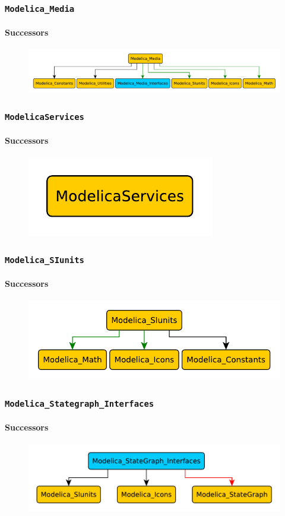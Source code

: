 \documentclass[aspectratio=1610]{beamer}
\begin{document}
\begin{frame}
  \frametitle{\texttt{Modelica\_Media}}
  \framesubtitle{Successors}
  \begin{figure}
      \includegraphics[width=\textwidth]{Modelica_Media}
  \end{figure}
\end{frame}

\begin{frame}
  \frametitle{\texttt{ModelicaServices}}
  \framesubtitle{Successors}
  \begin{figure}
      \includegraphics[width=\textwidth]{ModelicaServices}
  \end{figure}
\end{frame}

\begin{frame}
  \frametitle{\texttt{Modelica\_SIunits}}
  \framesubtitle{Successors}
  \begin{figure}
      \includegraphics[width=\textwidth]{Modelica_SIunits}
  \end{figure}
\end{frame}

\begin{frame}
  \frametitle{\texttt{Modelica\_Stategraph\_Interfaces}}
  \framesubtitle{Successors}
  \begin{figure}
      \includegraphics[width=\textwidth]{Modelica_Stategraph_Interfaces}
  \end{figure}
\end{frame}
\end{document}
